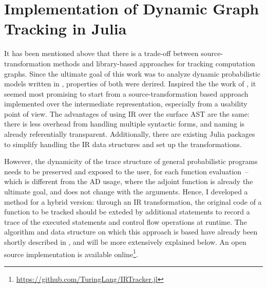 \chapter{Implementation of Dynamic Graph Tracking in Julia}
\label{cha:impl-dynam-graph}

It has been mentioned above that there is a trade-off between source-transformation methods and
library-based approaches for tracking computation graphs.  Since the ultimate goal of this work was
to analyze dynamic probabilistic models written in \turingjl{}, properties of both were derired.
Inspired the the work of \textcite{innes2018don}, it seemed most promising to start from a
source-transformation based approach implemented over the intermediate representation, especially
from a usability point of view.  The advantages of using IR over the surface AST are the same: there
is less overhead from handling multiple syntactic forms, and naming is already referentially
transparent.  Additionally, there are existing Julia packages to simplify handling the IR data
structures and set up the transformations.

However, the dynamicity of the trace structure of general probabilistic programs needs to be
preserved and exposed to the user, for each function evaluation~-- which is different from the AD
usage, where the adjoint function is already the ultimate goal, and does not change with the
arguments.  Hence, I developed a method for a hybrid version: through an IR transformation, the
original code of a function to be tracked should be exteded by additional statements to record a
trace of the executed statements and control flow operations at runtime.  The algorithm and data
structure on which this approach is based have already been shortly described in
\textcite{gabler2019graph}, and will be more extensively explained below.  An open source
implementation is available
online\footnote{\protect\url{https://github.com/TuringLang/IRTracker.jl}}.

